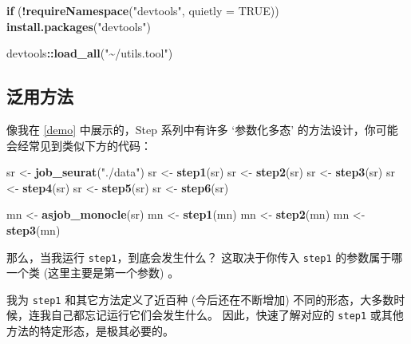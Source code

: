 \documentclass[
]{article}
\newenvironment{Shaded}{\begin{snugshade}}{\end{snugshade}}
\newcommand{\ControlFlowTok}[1]{\textcolor[rgb]{0.13,0.29,0.53}{\textbf{#1}}}
\newcommand{\DataTypeTok}[1]{\textcolor[rgb]{0.13,0.29,0.53}{#1}}
\newcommand{\KeywordTok}[1]{\textcolor[rgb]{0.13,0.29,0.53}{\textbf{#1}}}
\newcommand{\NormalTok}[1]{#1}
\newcommand{\OperatorTok}[1]{\textcolor[rgb]{0.81,0.36,0.00}{\textbf{#1}}}
\newcommand{\OtherTok}[1]{\textcolor[rgb]{0.56,0.35,0.01}{#1}}
\newcommand{\StringTok}[1]{\textcolor[rgb]{0.31,0.60,0.02}{#1}}
\begin{document}
\begin{Shaded}
\begin{Highlighting}[]
\ControlFlowTok{if}\NormalTok{ (}\OperatorTok{!}\KeywordTok{requireNamespace}\NormalTok{(}\StringTok{"devtools"}\NormalTok{, }\DataTypeTok{quietly =} \OtherTok{TRUE}\NormalTok{))}
  \KeywordTok{install.packages}\NormalTok{(}\StringTok{"devtools"}\NormalTok{)}

\NormalTok{devtools}\OperatorTok{::}\KeywordTok{load\_all}\NormalTok{(}\StringTok{"\textasciitilde{}/utils.tool"}\NormalTok{)}
\end{Highlighting}
\end{Shaded}

\hypertarget{ux6cdbux7528ux65b9ux6cd5}{%
\subsection{泛用方法}\label{ux6cdbux7528ux65b9ux6cd5}}

像我在 \ref{demo} 中展示的，Step 系列中有许多 `参数化多态' 的方法设计，你可能会经常见到类似下方的代码：

\begin{Shaded}
\begin{Highlighting}[]
\NormalTok{sr \textless{}{-}}\StringTok{ }\KeywordTok{job\_seurat}\NormalTok{(}\StringTok{"./data"}\NormalTok{)}
\NormalTok{sr \textless{}{-}}\StringTok{ }\KeywordTok{step1}\NormalTok{(sr)}
\NormalTok{sr \textless{}{-}}\StringTok{ }\KeywordTok{step2}\NormalTok{(sr)}
\NormalTok{sr \textless{}{-}}\StringTok{ }\KeywordTok{step3}\NormalTok{(sr)}
\NormalTok{sr \textless{}{-}}\StringTok{ }\KeywordTok{step4}\NormalTok{(sr)}
\NormalTok{sr \textless{}{-}}\StringTok{ }\KeywordTok{step5}\NormalTok{(sr)}
\NormalTok{sr \textless{}{-}}\StringTok{ }\KeywordTok{step6}\NormalTok{(sr)}

\NormalTok{mn \textless{}{-}}\StringTok{ }\KeywordTok{asjob\_monocle}\NormalTok{(sr)}
\NormalTok{mn \textless{}{-}}\StringTok{ }\KeywordTok{step1}\NormalTok{(mn)}
\NormalTok{mn \textless{}{-}}\StringTok{ }\KeywordTok{step2}\NormalTok{(mn)}
\NormalTok{mn \textless{}{-}}\StringTok{ }\KeywordTok{step3}\NormalTok{(mn)}
\end{Highlighting}
\end{Shaded}

那么，当我运行 \texttt{step1}，到底会发生什么？
这取决于你传入 \texttt{step1} 的参数属于哪一个类 (这里主要是第一个参数) 。

我为 \texttt{step1} 和其它方法定义了近百种 (今后还在不断增加) 不同的形态，大多数时候，连我自己都忘记运行它们会发生什么。
因此，快速了解对应的 \texttt{step1} 或其他方法的特定形态，是极其必要的。
\end{document}
